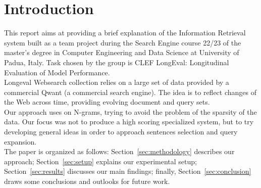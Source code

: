 \section{Introduction}
\label{sec:introduction}


This report aims at providing a brief explanation of the Information Retrieval system built
as a team project during the Search Engine course 22/23 of the master’s degree in Computer
Engineering and Data Science at University of Padua, Italy.
Task chosen by the group is CLEF LongEval: Longitudinal Evaluation of Model Performance.\\
Longeval Websearch collection\cite{traindata} relies on a large set of data provided by a commercial Qwant
(a commercial search engine). The idea is to reflect changes of the Web across time,
providing evolving document and query sets.\\
Our approach uses on N-grams, trying to avoid the problem of the sparsity of the data.
Our focus was not to produce a high scoring specialized system, but to try
developing general ideas in order to approach sentences selection and query expansion.\\
The paper is organized as follows: Section~\ref{sec:methodology} describes our approach;
Section~\ref{sec:setup} explains our experimental setup;
Section~\ref{sec:results} discusses our main findings; finally,
Section~\ref{sec:conclusion} draws some conclusions and outlooks for future work.